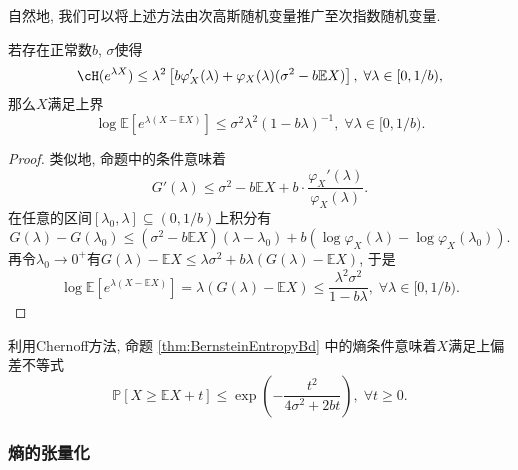 自然地, 我们可以将上述方法由次高斯随机变量推广至次指数随机变量. 
\begin{proposition}[Bernstein熵的界]\label{thm:BernsteinEntropyBd}
	若存在正常数$b$, $\sigma$使得
	\begin{equation*}
		\cH(e^{\lambda X}) 
		\leq \lambda^2 \left[ b \varphi_X'(\lambda) + \varphi_X(\lambda)(\sigma^2 - b \mathbb{E}X) \right],\;
		\forall \lambda \in [0, 1/b), 
	\end{equation*}
	那么$X$满足上界
	\begin{equation*}
		\log \mathbb{E}\left[ e^{\lambda(X - \mathbb{E}X)}\right] 
		\leq \sigma^2 \lambda^2 (1 - b \lambda)^{-1},\; 
		\forall \lambda \in [0, 1/b). 
	\end{equation*}
\end{proposition}
\begin{proof}
	类似地, 命题中的条件意味着
	\begin{equation*}
		G'(\lambda) 
		\leq \sigma^2 - b \mathbb{E}X + b \cdot \frac{\varphi_X'(\lambda)}{\varphi_X(\lambda)}. 
	\end{equation*}
	在任意的区间$[\lambda_0, \lambda] \subseteq (0, 1/b)$上积分有
	\begin{equation*}
		G(\lambda) - G(\lambda_0) 
		\leq (\sigma^2 - b \mathbb{E}X)(\lambda - \lambda_0) + b(\log \varphi_X(\lambda) - \log \varphi_X(\lambda_0)). 
	\end{equation*}
	再令$\lambda_0 \to 0^+$有$G(\lambda) - \mathbb{E}X \leq \lambda \sigma^2 + b \lambda (G(\lambda) - \mathbb{E}X)$, 于是
	\begin{equation*}
		\log \mathbb{E}\left[e^{\lambda(X - \mathbb{E}X)}\right]
		= \lambda(G(\lambda) - \mathbb{E}X)
		\leq \frac{\lambda^2 \sigma^2}{1 - b \lambda} ,\; 
		\forall \lambda \in [0, 1/b). 
	\end{equation*}
\end{proof}
\begin{corollary}
	利用Chernoff方法, 命题 \ref{thm:BernsteinEntropyBd} 中的熵条件意味着$X$满足上偏差不等式
	\begin{equation*}
		\mathbb{P}[X \geq \mathbb{E}X + t] 
		\leq \exp \left(- \frac{t^2}{4 \sigma^2 + 2b t} \right),\;
		\forall t \geq 0. 
	\end{equation*}
\end{corollary}

\subsubsection{熵的张量化}

